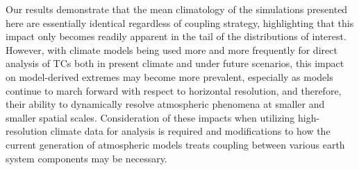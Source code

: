 \documentclass[draft,ms]{AGUTeX}
\begin{document}
\begin{article}
Our results demonstrate that the mean climatology of the simulations presented here are essentially identical regardless of coupling strategy, highlighting that this impact only becomes readily apparent in the tail of the distributions of interest. However, with climate models being used more and more frequently for direct analysis of TCs both in present climate and under future scenarios, this impact on model-derived extremes may become more prevalent, especially as models continue to march forward with respect to horizontal resolution, and therefore, their ability to dynamically resolve atmospheric phenomena at smaller and smaller spatial scales. Consideration of these impacts when utilizing high-resolution climate data for analysis is required and modifications to how the current generation of atmospheric models treats coupling between various earth system components may be necessary.





%
%


\end{article}
\end{document}
